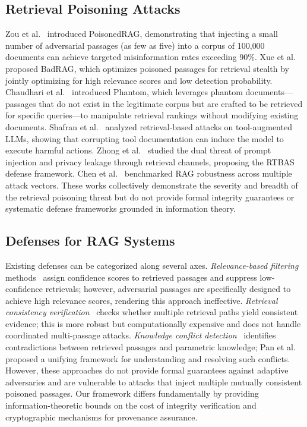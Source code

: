 \documentclass[journal,10pt]{IEEEtran}
\begin{document}
\subsection{Retrieval Poisoning Attacks}
Zou et al.~\cite{zou2024poisonedrag} introduced PoisonedRAG, demonstrating that injecting a small number of adversarial passages (as few as five) into a corpus of 100{,}000 documents can achieve targeted misinformation rates exceeding 90\%. Xue et al.~\cite{xue2024badrag} proposed BadRAG, which optimizes poisoned passages for retrieval stealth by jointly optimizing for high relevance scores and low detection probability. Chaudhari et al.~\cite{chaudhari2024phantom} introduced Phantom, which leverages phantom documents---passages that do not exist in the legitimate corpus but are crafted to be retrieved for specific queries---to manipulate retrieval rankings without modifying existing documents. Shafran et al.~\cite{shafran2024machete} analyzed retrieval-based attacks on tool-augmented LLMs, showing that corrupting tool documentation can induce the model to execute harmful actions. Zhong et al.~\cite{zhong2025rtbas} studied the dual threat of prompt injection and privacy leakage through retrieval channels, proposing the RTBAS defense framework. Chen et al.~\cite{chen2024benchmarking} benchmarked RAG robustness across multiple attack vectors. These works collectively demonstrate the severity and breadth of the retrieval poisoning threat but do not provide formal integrity guarantees or systematic defense frameworks grounded in information theory.

\subsection{Defenses for RAG Systems}
Existing defenses can be categorized along several axes. \emph{Relevance-based filtering} methods~\cite{yu2023chainofnote} assign confidence scores to retrieved passages and suppress low-confidence retrievals; however, adversarial passages are specifically designed to achieve high relevance scores, rendering this approach ineffective. \emph{Retrieval consistency verification}~\cite{weller2022defending} checks whether multiple retrieval paths yield consistent evidence; this is more robust but computationally expensive and does not handle coordinated multi-passage attacks. \emph{Knowledge conflict detection}~\cite{xie2024knowledgeconflict} identifies contradictions between retrieved passages and parametric knowledge; Pan et al.~\cite{pan2024unifying} proposed a unifying framework for understanding and resolving such conflicts. However, these approaches do not provide formal guarantees against adaptive adversaries and are vulnerable to attacks that inject multiple mutually consistent poisoned passages. Our framework differs fundamentally by providing information-theoretic bounds on the cost of integrity verification and cryptographic mechanisms for provenance assurance.
\end{document}
